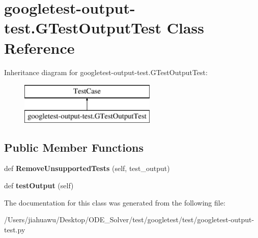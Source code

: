 \hypertarget{classgoogletest-output-test_1_1_g_test_output_test}{}\section{googletest-\/output-\/test.G\+Test\+Output\+Test Class Reference}
\label{classgoogletest-output-test_1_1_g_test_output_test}
Inheritance diagram for googletest-\/output-\/test.G\+Test\+Output\+Test\+:\begin{figure}[H]
\begin{center}
\leavevmode
\includegraphics[height=2.000000cm]{classgoogletest-output-test_1_1_g_test_output_test}
\end{center}
\end{figure}
\subsection*{Public Member Functions}
\begin{DoxyCompactItemize}
\item 
\mbox{\label{classgoogletest-output-test_1_1_g_test_output_test_af058c7917b05d06b0e6249061db264a3}} 
def {\bfseries Remove\+Unsupported\+Tests} (self, test\+\_\+output)
\item 
\mbox{\label{classgoogletest-output-test_1_1_g_test_output_test_a4ab77925377e6c837d33f07960a31212}} 
def {\bfseries test\+Output} (self)
\end{DoxyCompactItemize}


The documentation for this class was generated from the following file\+:\begin{DoxyCompactItemize}
\item 
/\+Users/jiahuawu/\+Desktop/\+O\+D\+E\+\_\+\+Solver/test/googletest/test/googletest-\/output-\/test.\+py\end{DoxyCompactItemize}
